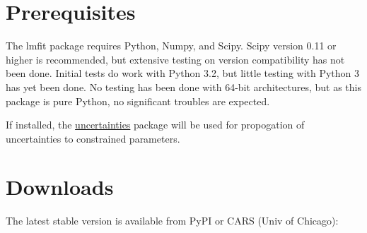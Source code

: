 \documentclass[letterpaper,10pt,english]{sphinxmanual}
\begin{document}
\section{Prerequisites}
\label{installation:prerequisites}
The lmfit package requires Python, Numpy, and Scipy.  Scipy version 0.11 or
higher is recommended, but extensive testing on version compatibility has
not been done.  Initial tests do work with Python 3.2, but little testing
with Python 3 has yet been done.  No testing has been done with 64-bit
architectures, but as this package is pure Python, no significant troubles
are expected.

If installed, the \href{http://packages.python.org/uncertainties/}{uncertainties} package will be used for propogation of
uncertainties to constrained parameters.


\section{Downloads}
\label{installation:downloads}
The latest stable version is available from PyPI or CARS (Univ of Chicago):
\end{document}
